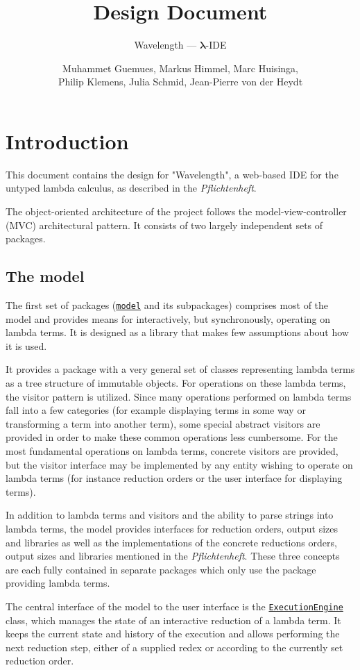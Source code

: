 \documentclass[a4paper, parskip=half]{scrartcl}
\title{Design Document}
\subtitle{Wavelength --- $\bm{\lambda}$-IDE}
\author{Muhammet Guemues, Markus Himmel, Marc Huisinga,\\Philip Klemens, Julia Schmid, Jean-Pierre von der Heydt}
\newcommand{\pkglnk}[1]{\hyperref[pkg:edu.kit.wavelength.client.#1]{#1}}
\begin{document}
\maketitle
\thispagestyle{empty}
\newpage
\tableofcontents
\newpage
\section{Introduction}

This document contains the design for "Wavelength", a web-based IDE for the untyped
lambda calculus, as described in the \textit{Pflichtenheft}.

The object-oriented architecture of the project follows the model-view-controller (MVC)
architectural pattern. It consists of two largely independent sets of packages.

\subsection{The model}

The first set of packages (\texttt{\pkglnk{model}} and its subpackages) comprises most of the model and provides means for interactively, but
synchronously, operating on lambda terms. It is designed as a library that makes few
assumptions about how it is used.

It provides a package with a very general set of classes representing
lambda terms as a tree structure of immutable objects. For operations on these lambda
terms, the visitor pattern is utilized. Since many operations performed on lambda terms
fall into a few categories (for example displaying terms in some way or transforming a term
into another term), some special abstract visitors are provided in order to make these common
operations less cumbersome. For the most fundamental operations on lambda terms, concrete
visitors are provided, but the visitor interface may be implemented by any entity wishing
to operate on lambda terms (for instance reduction orders or the user interface for displaying
terms).

In addition to lambda terms and visitors and the ability to parse strings into
lambda terms, the model provides interfaces for reduction orders,
output sizes and libraries as well as the implementations of the concrete reductions orders,
output sizes and libraries mentioned in the \textit{Pflichtenheft}. These three
concepts are each fully contained in separate packages which only use the package
providing lambda terms.

The central interface of the model to the user interface is the
\texttt{\hyperref[type:edu.kit.wavelength.client.model.ExecutionEngine]{ExecutionEngine}}
class, which manages the state of an interactive reduction of a lambda term. It
keeps the current state and history of the execution and allows performing the next
reduction step, either of a supplied redex or according to the currently set reduction
order.
\end{document}
